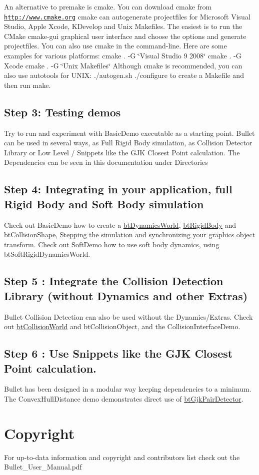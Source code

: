 An alternative to premake is cmake. You can download cmake from \href{http://www.cmake.org}{\tt http://www.cmake.org} cmake can autogenerate projectfiles for Microsoft Visual Studio, Apple Xcode, KDevelop and Unix Makefiles. The easiest is to run the CMake cmake-gui graphical user interface and choose the options and generate projectfiles. You can also use cmake in the command-line. Here are some examples for various platforms: cmake . -G \char`\"{}Visual Studio 9 2008\char`\"{} cmake . -G Xcode cmake . -G \char`\"{}Unix Makefiles\char`\"{} Although cmake is recommended, you can also use autotools for UNIX: ./autogen.sh ./configure to create a Makefile and then run make.\hypertarget{index_step3}{}\subsection{Step 3: Testing demos}\label{index_step3}
Try to run and experiment with BasicDemo executable as a starting point. Bullet can be used in several ways, as Full Rigid Body simulation, as Collision Detector Library or Low Level / Snippets like the GJK Closest Point calculation. The Dependencies can be seen in this documentation under Directories\hypertarget{index_step4}{}\subsection{Step 4: Integrating in your application, full Rigid Body and Soft Body simulation}\label{index_step4}
Check out BasicDemo how to create a \hyperlink{classbt_dynamics_world}{btDynamicsWorld}, \hyperlink{classbt_rigid_body}{btRigidBody} and btCollisionShape, Stepping the simulation and synchronizing your graphics object transform. Check out SoftDemo how to use soft body dynamics, using btSoftRigidDynamicsWorld. \hypertarget{index_step5}{}\subsection{Step 5 : Integrate the Collision Detection Library (without Dynamics and other Extras)}\label{index_step5}
Bullet Collision Detection can also be used without the Dynamics/Extras. Check out \hyperlink{classbt_collision_world}{btCollisionWorld} and btCollisionObject, and the CollisionInterfaceDemo. \hypertarget{index_step6}{}\subsection{Step 6 : Use Snippets like the GJK Closest Point calculation.}\label{index_step6}
Bullet has been designed in a modular way keeping dependencies to a minimum. The ConvexHullDistance demo demonstrates direct use of \hyperlink{classbt_gjk_pair_detector}{btGjkPairDetector}.\hypertarget{index_copyright}{}\section{Copyright}\label{index_copyright}
For up-to-data information and copyright and contributors list check out the Bullet\_\-User\_\-Manual.pdf 